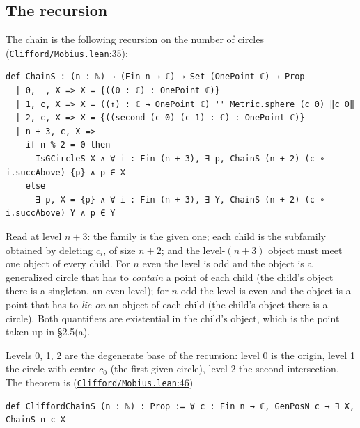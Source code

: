 \documentclass[11pt]{article}
\theoremstyle{definition}
\theoremstyle{remark}
\begin{document}
\hypertarget{the-recursion}{%
\subsection{The recursion}\label{the-recursion}}

The chain is the following recursion on the number of circles (\href{https://github.com/jpbald93/paperl_clifford_chain/blob/e1ae145c2565cc98816635387412edc0a740c27c/Clifford/Mobius.lean\#L35}{\texttt{Clifford/\allowbreak Mobius.lean}:35}):

\begin{Verbatim}
def ChainS : (n : ℕ) → (Fin n → ℂ) → Set (OnePoint ℂ) → Prop
  | 0, _, X => X = {((0 : ℂ) : OnePoint ℂ)}
  | 1, c, X => X = ((↑) : ℂ → OnePoint ℂ) '' Metric.sphere (c 0) ‖c 0‖
  | 2, c, X => X = {((second (c 0) (c 1) : ℂ) : OnePoint ℂ)}
  | n + 3, c, X =>
    if n % 2 = 0 then
      IsGCircleS X ∧ ∀ i : Fin (n + 3), ∃ p, ChainS (n + 2) (c ∘ i.succAbove) {p} ∧ p ∈ X
    else
      ∃ p, X = {p} ∧ ∀ i : Fin (n + 3), ∃ Y, ChainS (n + 2) (c ∘ i.succAbove) Y ∧ p ∈ Y
\end{Verbatim}

Read at level \(n+3\): the family is the given one; each child is the subfamily obtained by deleting \(c_i\),
of size \(n+2\); and the level-\((n+3)\) object must meet one object of every child. For \(n\) even the level is
odd and the object is a generalized circle that has to \emph{contain} a point of each child (the child's object
there is a singleton, an even level); for \(n\) odd the level is even and the object is a point that has to
\emph{lie on} an object of each child (the child's object there is a circle). Both quantifiers are existential
in the child's object, which is the point taken up in \S{}2.5(a).

Levels 0, 1, 2 are the degenerate base of the recursion: level 0 is the origin, level 1 the circle with
centre \(c_0\) (the first given circle), level 2 the second intersection. The theorem is
(\href{https://github.com/jpbald93/paperl_clifford_chain/blob/e1ae145c2565cc98816635387412edc0a740c27c/Clifford/Mobius.lean\#L46}{\texttt{Clifford/\allowbreak Mobius.lean}:46})

\begin{Verbatim}
def CliffordChainS (n : ℕ) : Prop := ∀ c : Fin n → ℂ, GenPosN c → ∃ X, ChainS n c X
\end{Verbatim}
\end{document}
